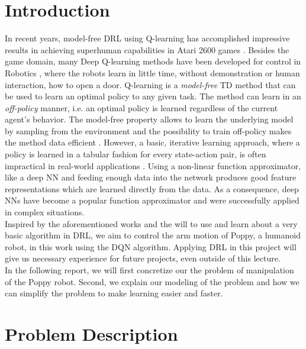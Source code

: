 \documentclass[a4paper,twoside, openright,12pt]{report}
\begin{document}
\chapter{Introduction}
In recent years, model-free \ac{DRL} using Q-learning has accomplished impressive results in achieving superhuman capabilities in Atari 2600 games \cite{mnih2013playing, mnih2015human, mnih2016asynchronous}. Besides the game domain, many Deep Q-learning methods have been developed for control in Robotics \cite{gu2016deep, gu2016offpolicy}, where the robots learn in little time, without demonstration or human interaction, how to open a door. Q-learning \cite{watkins1992q, watkins1989learning} is a \textit{model-free} \ac{TD} method that can be used to learn an optimal policy to any given task. The method can learn in an \textit{off-policy} manner, i.e. an optimal policy is learned regardless of the current agent's behavior. The model-free property allows to learn the underlying model by sampling from the environment and the possibility to train off-policy makes the method data efficient \cite{gu2016offpolicy}. However, a basic, iterative learning approach, where a policy is learned in a tabular fashion for every state-action pair, is often impractical in real-world applications \cite{kober2012reinforcement}. Using a non-linear function approximator, like a deep \ac{NN} and feeding enough data into the network produces good feature representations which are learned directly from the data. As a consequence, deep \acp{NN} have become a popular function approximator and were successfully applied in complex situations. \\
Inspired by the aforementioned works and the will to use and learn about a very basic algorithm in \ac{DRL}, we aim to control the arm motion of Poppy, a humanoid robot, in this work using the \ac{DQN} algorithm. Applying \ac{DRL} in this project will give us necessary experience for future projects, even outside of this lecture. \\
In the following report, we will first concretize our the problem of manipulation of the Poppy robot. Second, we explain our modeling of the problem and how we can simplify the problem to make learning easier and faster.

\chapter{Problem Description}
\end{document}
